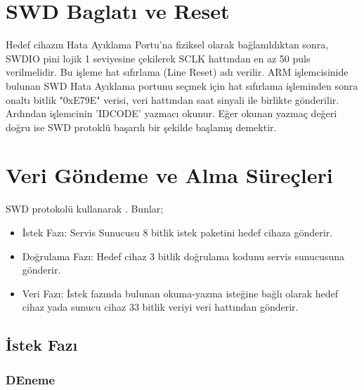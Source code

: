 \section{SWD Baglatı ve Reset}

Hedef cihazın Hata Ayıklama Portu'na fiziksel olarak bağlanıldıktan sonra, SWDIO pini lojik 1 seviyesine çekilerek SCLK hattından en az 50 puls verilmelidir. Bu işleme hat sıfırlama (Line Reset) adı verilir.
ARM işlemcisinide bulunan SWD Hata Ayıklama portunu seçmek için hat sıfırlama işleminden sonra onaltı bitlik "0xE79E" verisi, veri hattından saat sinyali ile birlikte gönderilir. Ardından
işlemcinin 'IDCODE' yazmacı okunur. Eğer okunan yazmaç değeri doğru ise SWD protoklü başarılı bir şekilde başlamış demektir.

\section{Veri Göndeme ve Alma Süreçleri}

SWD protokolü kullanarak . Bunlar;
\begin{itemize}
	\item İstek Fazı: Servis Sunucusu 8 bitlik istek paketini hedef cihaza gönderir.
	\item Doğrulama Fazı: Hedef cihaz 3 bitlik doğrulama kodunu servis sunucusuna gönderir.
	\item Veri Fazı: İstek fazında bulunan okuma-yazma isteğine bağlı olarak hedef cihaz yada sunucu cihaz 33 bitlik veriyi veri hattından gönderir.
\end{itemize}


\subsection{İstek Fazı}

\subsubsection{DEneme}



